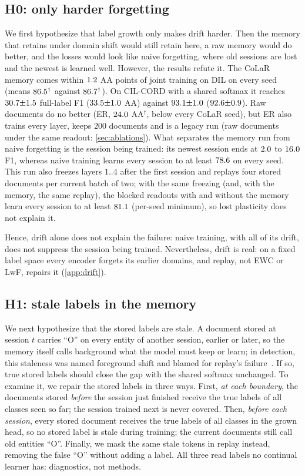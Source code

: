\documentclass[10pt,twocolumn,letterpaper]{article}
\begin{document}
\subsection{H0: only harder forgetting}
\label{sec:h0}
We first hypothesize that label growth only makes drift harder. Then the memory that retains under domain shift would still retain here, a raw memory would do better, and the losses would look like naive forgetting, where old sessions are lost and the newest is learned well. However, the results refute it. The CoLaR memory comes within $1.2$ AA points of joint training on DIL on every seed (means $86.5^\dagger$ against $86.7^\dagger$). On CIL-CORD with a shared softmax it reaches $30.7{\pm}1.5$ full-label F1 ($33.5{\pm}1.0$ AA) against $93.1{\pm}1.0$ ($92.6{\pm}0.9$). Raw documents do no better (ER, $24.0$ AA$^\dagger$, below every CoLaR seed), but ER also trains every layer, keeps $200$ documents and is a legacy run (raw documents under the same readout: \cref{sec:ablations}). What separates the memory run from naive forgetting is the session being trained: its newest session ends at $2.0$ to $16.0$ F1, whereas naive training learns every session to at least $78.6$ on every seed. This run also freezes layers $1..4$ after the first session and replays four stored documents per current batch of two; with the same freezing (and, with the memory, the same replay), the blocked readouts with and without the memory learn every session to at least $81.1$ (per-seed minimum), so lost plasticity does not explain it.

Hence, drift alone does not explain the failure: naive training, with all of its drift, does not suppress the session being trained. Nevertheless, drift is real: on a fixed label space every encoder forgets its earlier domains, and replay, not EWC or LwF, repairs it (\cref{app:drift}).

\subsection{H1: stale labels in the memory}
\label{sec:h1}
We next hypothesize that the stored labels are stale. A document stored at session $t$ carries ``O'' on every entity of another session, earlier or later, so the memory itself calls background what the model must keep or learn; in detection, this staleness was named foreground shift and blamed for replay's failure~\citep{liu2023abr}. If so, true stored labels should close the gap with the shared softmax unchanged. To examine it, we repair the stored labels in three ways. First, \emph{at each boundary}, the documents stored \emph{before} the session just finished receive the true labels of all classes seen so far; the session trained next is never covered. Then, \emph{before each session}, every stored document receives the true labels of all classes in the grown head, so no stored label is stale during training; the current documents still call old entities ``O''. Finally, we mask the same stale tokens in replay instead, removing the false ``O'' without adding a label. All three read labels no continual learner has: diagnostics, not methods.
\end{document}
